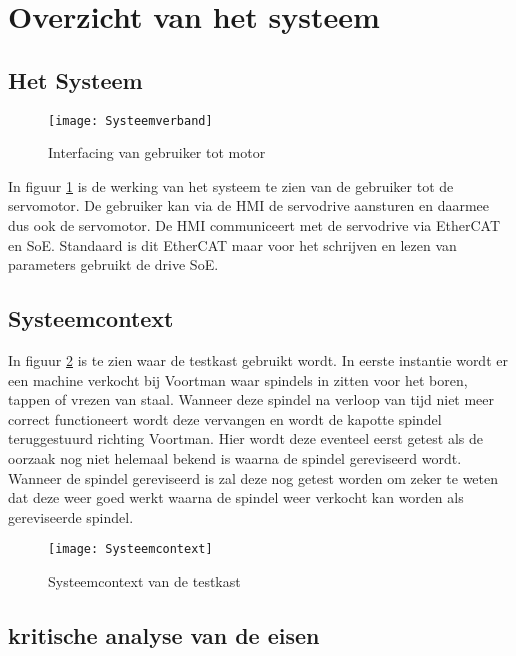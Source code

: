 \section{Overzicht van het systeem}

\subsection{Het Systeem}

\begin{figure}[H]
	\centering
	\texttt{[image: Systeemverband]}
	\label{fig:SysteemVerband}
	\caption{Interfacing van gebruiker tot motor}
\end{figure}

In figuur \ref{fig:SysteemVerband} is de werking van het systeem te zien van de gebruiker tot de servomotor. De gebruiker kan via de \gls{HMI} de servodrive aansturen en daarmee dus ook de servomotor. De \gls{HMI} communiceert met de servodrive via \gls{EtherCAT} en \gls{SoE}. Standaard is dit \gls{EtherCAT} maar voor het schrijven en lezen van parameters gebruikt de drive \gls{SoE}.

\newpage

\subsection{Systeemcontext}

In figuur \ref{fig:Systeemcontext} is te zien waar de testkast gebruikt wordt. In eerste instantie wordt er een machine verkocht bij Voortman waar spindels in zitten voor het boren, tappen of vrezen van staal. Wanneer deze spindel na verloop van tijd niet meer correct functioneert wordt deze vervangen en wordt de kapotte spindel teruggestuurd richting Voortman. Hier wordt deze eventeel eerst getest als de oorzaak nog niet helemaal bekend is waarna de spindel gereviseerd wordt. Wanneer de spindel gereviseerd is zal deze nog getest worden om zeker te weten dat deze weer goed werkt waarna de spindel weer verkocht kan worden als gereviseerde spindel.

\begin{figure}[H]
	\centering
	\texttt{[image: Systeemcontext]}
	\label{fig:Systeemcontext}
	\caption{Systeemcontext van de testkast}
\end{figure}

\newpage

\subsection{kritische analyse van de eisen}

